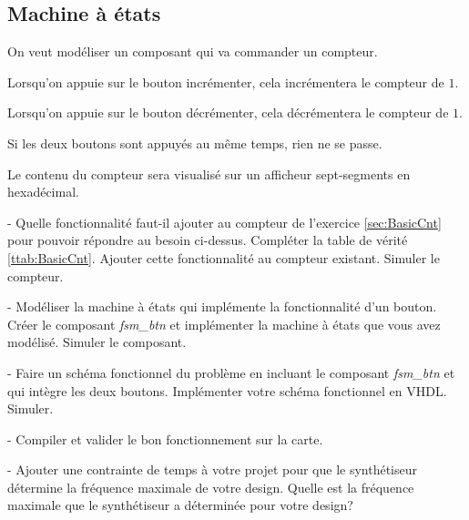 \subsection{Machine à états}
On veut modéliser un composant qui va commander un compteur.

Lorsqu'on appuie sur le bouton incrémenter, cela incrémentera le compteur de $1$.

Lorsqu'on appuie sur le bouton décrémenter, cela décrémentera le compteur de $1$.

Si les deux boutons sont appuyés au même temps, rien ne se passe.

Le contenu du compteur sera visualisé sur un afficheur sept-segments en hexadécimal.

\medskip

- Quelle fonctionnalité faut-il ajouter au compteur de l’exercice \ref{sec:BasicCnt} pour pouvoir répondre au besoin ci-dessus. Compléter la table de vérité \ref{ttab:BasicCnt}. Ajouter cette fonctionnalité au compteur existant. Simuler le compteur.

\medskip

- Modéliser la machine à états qui implémente la fonctionnalité d'un bouton. Créer le composant \textit{fsm\_btn} et implémenter la machine à états que vous avez modélisé. Simuler le composant.

\medskip

- Faire un schéma fonctionnel du problème en incluant le composant \textit{fsm\_btn} et qui intègre les deux boutons. Implémenter votre schéma fonctionnel en VHDL. Simuler.

\medskip

- Compiler et valider le bon fonctionnement sur la carte.

\medskip

- Ajouter une contrainte de temps à votre projet pour que le synthétiseur détermine la fréquence maximale de votre design. Quelle est la fréquence maximale que le synthétiseur a déterminée pour votre design?
